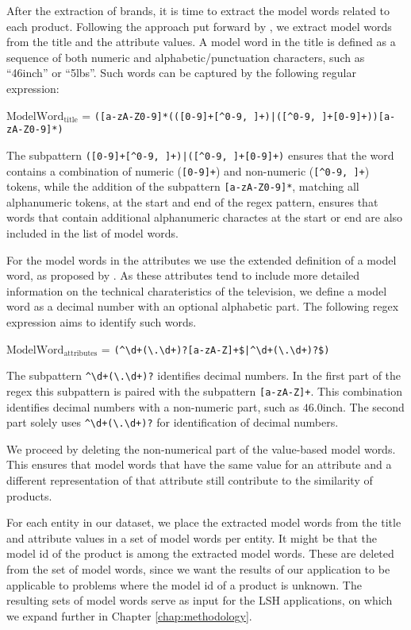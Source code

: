 After the extraction of brands, it is time to extract the model words related to each product. Following the approach put forward by \cite{HartveldKMNPFS18}, we extract model words from the title and the attribute values. A model word in the title is defined as a sequence of both numeric and alphabetic/punctuation characters, such as ``46inch'' or ``5lbs''. Such words can be captured by the following regular expression:

\begin{center}
    $\text{ModelWord}_{\text{title}}$ = \verb !([a-zA-Z0-9]*(([0-9]+[^0-9, ]+)|([^0-9, ]+[0-9]+))[a-zA-Z0-9]*)!
\end{center}
The subpattern \verb!([0-9]+[^0-9, ]+)|([^0-9, ]+[0-9]+)! ensures that the word contains a combination of numeric (\verb![0-9]+!) and non-numeric (\verb![^0-9, ]+!) tokens, while the addition of the subpattern \verb![a-zA-Z0-9]*!, matching all alphanumeric tokens, at the start and end of the regex pattern, ensures that words that contain additional alphanumeric charactes at the start or end are also included in the list of model words.

For the model words in the attributes we use the extended definition of a model word, as proposed by \cite{HartveldKMNPFS18}. As these attributes tend to include more detailed information on the technical charateristics of the television, we define a model word as a decimal number with an optional alphabetic part. The following regex expression aims to identify such words.

\begin{center}
$\text{ModelWord}_{\text{attributes}}$ = \verb !(^\d+(\.\d+)?[a-zA-Z]+$|^\d+(\.\d+)?$)!
\end{center}

The subpattern \verb!^\d+(\.\d+)?! identifies decimal numbers. In the first part of the regex this subpattern is paired with the subpattern \verb![a-zA-Z]+!. This combination identifies decimal numbers with a non-numeric part, such as $46.0$inch. The second part solely uses \verb!^\d+(\.\d+)?! for identification of decimal numbers. 

We proceed by deleting the non-numerical part of the value-based model words. This ensures that model words that have the same value for an attribute and a different representation of that attribute still contribute to the similarity of products.

For each entity in our dataset, we place the extracted model words from the title and attribute values in a set of model words per entity. It might be that the model id of the product is among the extracted model words. These are deleted from the set of model words, since we want the results of our application to be applicable to problems where the model id of a product is unknown. The resulting sets of model words serve as input for the LSH applications, on which we expand further in Chapter \ref{chap:methodology}. 

